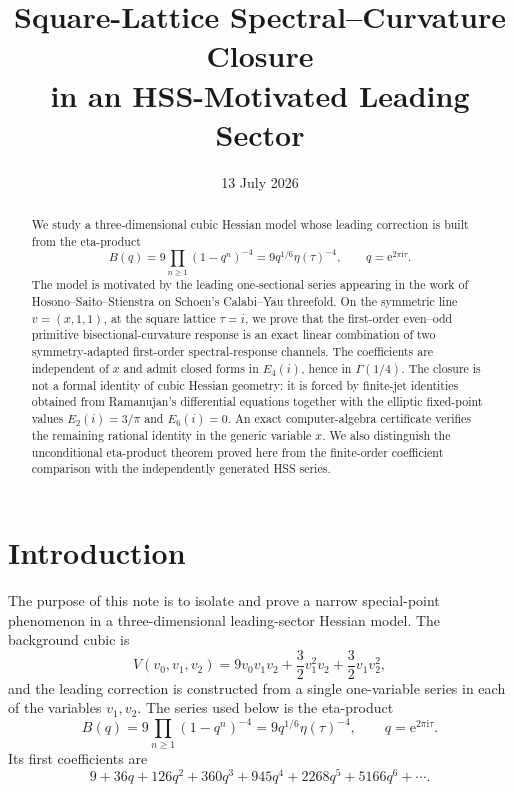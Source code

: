 \documentclass[11pt]{article}
\title{\textbf{Square-Lattice Spectral--Curvature Closure\\in an HSS-Motivated Leading Sector}}
\author{}
\date{13 July 2026}
\theoremstyle{definition}
\theoremstyle{remark}
\newcommand{\ii}{\mathrm{i}}
\newcommand{\e}{\mathrm{e}}
\begin{document}
\maketitle

\begin{abstract}
We study a three-dimensional cubic Hessian model whose leading correction is built from the eta-product
\[
 B(q)=9\prod_{n\ge 1}(1-q^n)^{-4}=9q^{1/6}\eta(\tau)^{-4},
 \qquad q=\e^{2\pi\ii\tau}.
\]
The model is motivated by the leading one-sectional series appearing in the work of Hosono--Saito--Stienstra on Schoen's Calabi--Yau threefold. On the symmetric line \(v=(x,1,1)\), at the square lattice \(\tau=i\), we prove that the first-order even--odd primitive bisectional-curvature response is an exact linear combination of two symmetry-adapted first-order spectral-response channels. The coefficients are independent of \(x\) and admit closed forms in \(E_4(i)\), hence in \(\Gamma(1/4)\). The closure is not a formal identity of cubic Hessian geometry: it is forced by finite-jet identities obtained from Ramanujan's differential equations together with the elliptic fixed-point values \(E_2(i)=3/\pi\) and \(E_6(i)=0\). An exact computer-algebra certificate verifies the remaining rational identity in the generic variable \(x\). We also distinguish the unconditional eta-product theorem proved here from the finite-order coefficient comparison with the independently generated HSS series.
\end{abstract}

\section{Introduction}

The purpose of this note is to isolate and prove a narrow special-point phenomenon in a three-dimensional leading-sector Hessian model. The background cubic is
\begin{equation}\label{eq:V}
 V(v_0,v_1,v_2)
 =9v_0v_1v_2+\frac32v_1^2v_2+\frac32v_1v_2^2,
\end{equation}
and the leading correction is constructed from a single one-variable series in each of the variables \(v_1,v_2\). The series used below is the eta-product
\begin{equation}\label{eq:Bdef}
 B(q)=9\prod_{n\ge 1}(1-q^n)^{-4}
     =9q^{1/6}\eta(\tau)^{-4},
 \qquad q=\e^{2\pi\ii\tau}.
\end{equation}
Its first coefficients are
\[
 9+36q+126q^2+360q^3+945q^4+2268q^5+5166q^6+\cdots.
\]
\end{document}
